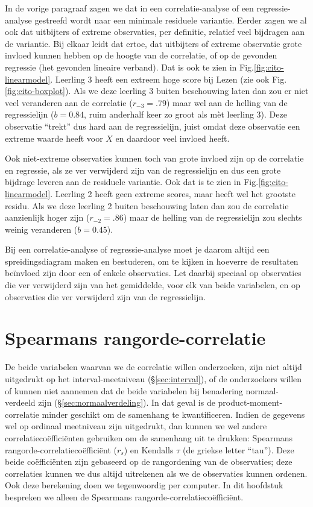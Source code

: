 \documentclass[
]{book}
\begin{document}
In de vorige paragraaf zagen we dat in een correlatie-analyse of een
regressie-analyse gestreefd wordt naar een minimale residuele variantie.
Eerder zagen we al ook dat uitbijters of extreme observaties, per
definitie, relatief veel bijdragen aan de variantie. Bij elkaar leidt
dat ertoe, dat uitbijters of extreme observatie grote invloed kunnen
hebben op de hoogte van de correlatie, of op de gevonden regressie (het
gevonden lineaire verband). Dat is ook te zien in
Fig.\ref{fig:cito-linearmodel}. Leerling 3 heeft een extreem hoge
score bij Lezen (zie ook
Fig.\ref{fig:cito-boxplot}). Als we deze leerling 3 buiten
beschouwing laten dan zou er niet veel veranderen aan de correlatie
(\(r_{-3}=.79\)) maar wel aan de helling van de regressielijn (\(b=0.84\),
ruim anderhalf keer zo groot als mèt leerling 3). Deze observatie
``trekt'' dus hard aan de regressielijn, juist omdat deze observatie een
extreme waarde heeft voor \(X\) en daardoor veel invloed heeft.

Ook niet-extreme observaties kunnen toch van grote invloed zijn op de
correlatie en regressie, als ze ver verwijderd zijn van de regressielijn
en dus een grote bijdrage leveren aan de residuele variantie. Ook dat is
te zien in Fig.\ref{fig:cito-linearmodel}.
Leerling 2 heeft geen extreme scores,
maar heeft wel het grootste residu. Als we deze leerling 2 buiten
beschouwing laten dan zou de correlatie aanzienlijk hoger zijn
(\(r_{-2}=.86\)) maar de helling van de regressielijn zou slechts weinig
veranderen (\(b=0.45\)).

Bij een correlatie-analyse of regressie-analyse moet je daarom altijd
een spreidingsdiagram maken en bestuderen, om te kijken in hoeverre de
resultaten beïnvloed zijn door een of enkele observaties. Let daarbij
speciaal op observaties die ver verwijderd zijn van het gemiddelde, voor
elk van beide variabelen, en op observaties die ver verwijderd zijn van
de regressielijn.

\hypertarget{sec:Spearman}{%
\section{Spearmans rangorde-correlatie}\label{sec:Spearman}}

De beide variabelen waarvan we de correlatie willen onderzoeken, zijn
niet altijd uitgedrukt op het interval-meetniveau
(§\ref{sec:interval}), of de onderzoekers willen of kunnen niet aannemen dat
de beide variabelen bij benadering normaal-verdeeld zijn
(§\ref{sec:normaalverdeling}).
In dat geval is de
product-moment-correlatie minder geschikt om de samenhang te
kwantificeren. Indien de gegevens wel op ordinaal meetniveau zijn
uitgedrukt, dan kunnen we wel andere correlatiecoëfficiënten gebruiken
om de samenhang uit te drukken: Spearmans rangorde-correlatiecoëfficiënt
(\(r_s\)) en Kendalls \(\tau\) (de griekse letter ``tau''). Deze beide
coëfficiënten zijn gebaseerd op de rangordening van de observaties; deze
correlaties kunnen we dus altijd uitrekenen als we de observaties kunnen
ordenen. Ook deze berekening doen we tegenwoordig per computer. In dit
hoofdstuk bespreken we alleen de Spearmans
rangorde-correlatiecoëfficiënt.
\end{document}
